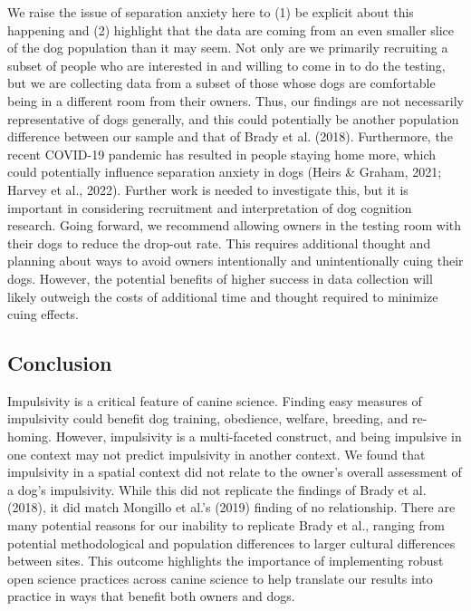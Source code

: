 \documentclass[
  pub,floatsintext]{apa6}
\begin{document}
We raise the issue of separation anxiety here to (1) be explicit about this happening and (2) highlight that the data are coming from an even smaller slice of the dog population than it may seem. Not only are we primarily recruiting a subset of people who are interested in and willing to come in to do the testing, but we are collecting data from a subset of those whose dogs are comfortable being in a different room from their owners. Thus, our findings are not necessarily representative of dogs generally, and this could potentially be another population difference between our sample and that of Brady et al. (2018). Furthermore, the recent COVID-19 pandemic has resulted in people staying home more, which could potentially influence separation anxiety in dogs (Heirs \& Graham, 2021; Harvey et al., 2022). Further work is needed to investigate this, but it is important in considering recruitment and interpretation of dog cognition research. Going forward, we recommend allowing owners in the testing room with their dogs to reduce the drop-out rate. This requires additional thought and planning about ways to avoid owners intentionally and unintentionally cuing their dogs. However, the potential benefits of higher success in data collection will likely outweigh the costs of additional time and thought required to minimize cuing effects.

\hypertarget{conclusion}{%
\subsection{Conclusion}\label{conclusion}}

Impulsivity is a critical feature of canine science. Finding easy measures of impulsivity could benefit dog training, obedience, welfare, breeding, and re-homing. However, impulsivity is a multi-faceted construct, and being impulsive in one context may not predict impulsivity in another context. We found that impulsivity in a spatial context did not relate to the owner's overall assessment of a dog's impulsivity. While this did not replicate the findings of Brady et al. (2018), it did match Mongillo et al.'s (2019) finding of no relationship. There are many potential reasons for our inability to replicate Brady et al., ranging from potential methodological and population differences to larger cultural differences between sites. This outcome highlights the importance of implementing robust open science practices across canine science to help translate our results into practice in ways that benefit both owners and dogs.
\end{document}
